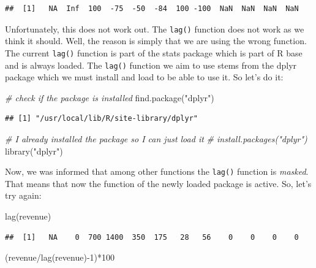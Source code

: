 \documentclass[
  12pt,
  oneside]{book}
\newenvironment{Shaded}{\begin{snugshade}}{\end{snugshade}}
\newcommand{\CommentTok}[1]{\textcolor[rgb]{0.56,0.35,0.01}{\textit{#1}}}
\newcommand{\DecValTok}[1]{\textcolor[rgb]{0.00,0.00,0.81}{#1}}
\newcommand{\FunctionTok}[1]{\textcolor[rgb]{0.00,0.00,0.00}{#1}}
\newcommand{\NormalTok}[1]{#1}
\newcommand{\SpecialCharTok}[1]{\textcolor[rgb]{0.00,0.00,0.00}{#1}}
\newcommand{\StringTok}[1]{\textcolor[rgb]{0.31,0.60,0.02}{#1}}
\theoremstyle{definition}
\theoremstyle{definition}
\theoremstyle{definition}
\theoremstyle{definition}
\theoremstyle{remark}
\begin{document}
\begin{verbatim}
##  [1]   NA  Inf  100  -75  -50  -84  100 -100  NaN  NaN  NaN  NaN
\end{verbatim}

Unfortunately, this does not work out. The \texttt{lag()} function does not work as we think it should. Well, the reason is simply that we are using the wrong function. The current \texttt{lag()} function is part of the stats package which is part of R base and is always loaded. The \texttt{lag()} function we aim to use stems from the dplyr package which we must install and load to be able to use it. So let's do it:

\begin{Shaded}
\begin{Highlighting}[]
\CommentTok{\# check if the package is installed}
\FunctionTok{find.package}\NormalTok{(}\StringTok{"dplyr"}\NormalTok{)}
\end{Highlighting}
\end{Shaded}

\begin{verbatim}
## [1] "/usr/local/lib/R/site-library/dplyr"
\end{verbatim}

\begin{Shaded}
\begin{Highlighting}[]
\CommentTok{\# I already installed the package so I can just load it}
\CommentTok{\# install.packages("dplyr")}
\FunctionTok{library}\NormalTok{(}\StringTok{"dplyr"}\NormalTok{)}
\end{Highlighting}
\end{Shaded}

Now, we was informed that among other functions the \texttt{lag()} function is \emph{masked}. That means that now the function of the newly loaded package is active. So, let's try again:

\begin{Shaded}
\begin{Highlighting}[]
\FunctionTok{lag}\NormalTok{(revenue)}
\end{Highlighting}
\end{Shaded}

\begin{verbatim}
##  [1]   NA    0  700 1400  350  175   28   56    0    0    0    0
\end{verbatim}

\begin{Shaded}
\begin{Highlighting}[]
\NormalTok{(revenue}\SpecialCharTok{/}\FunctionTok{lag}\NormalTok{(revenue)}\SpecialCharTok{{-}}\DecValTok{1}\NormalTok{)}\SpecialCharTok{*}\DecValTok{100} 
\end{Highlighting}
\end{Shaded}
\end{document}
